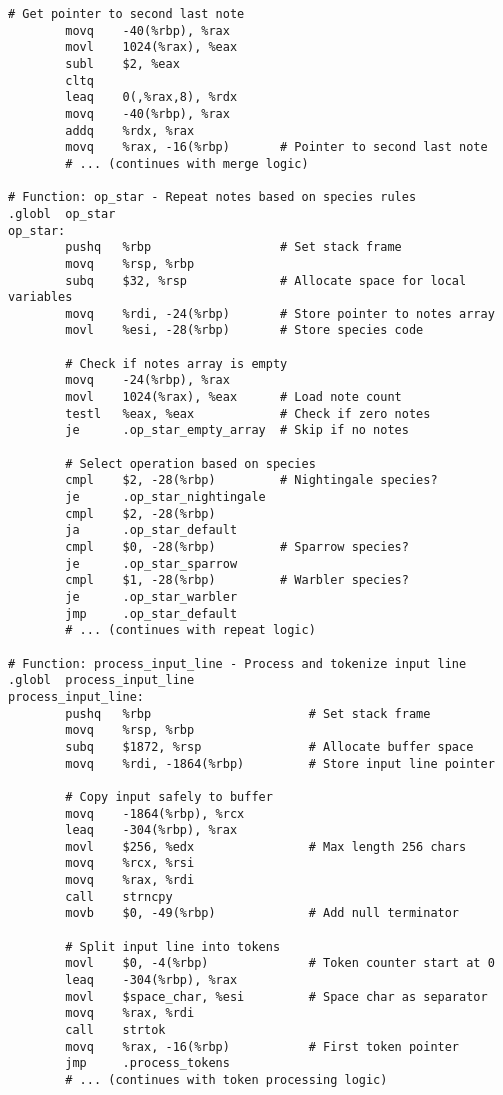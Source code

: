\documentclass[11pt]{article}
\begin{document}
\begin{lstlisting}[language={[x86masm]Assembler}, basicstyle=\ttfamily\footnotesize]
        # Get pointer to second last note
        movq    -40(%rbp), %rax
        movl    1024(%rax), %eax
        subl    $2, %eax
        cltq
        leaq    0(,%rax,8), %rdx
        movq    -40(%rbp), %rax
        addq    %rdx, %rax
        movq    %rax, -16(%rbp)       # Pointer to second last note
        # ... (continues with merge logic)

# Function: op_star - Repeat notes based on species rules
.globl  op_star
op_star:
        pushq   %rbp                  # Set stack frame
        movq    %rsp, %rbp
        subq    $32, %rsp             # Allocate space for local variables
        movq    %rdi, -24(%rbp)       # Store pointer to notes array
        movl    %esi, -28(%rbp)       # Store species code
        
        # Check if notes array is empty
        movq    -24(%rbp), %rax
        movl    1024(%rax), %eax      # Load note count
        testl   %eax, %eax            # Check if zero notes
        je      .op_star_empty_array  # Skip if no notes
        
        # Select operation based on species
        cmpl    $2, -28(%rbp)         # Nightingale species?
        je      .op_star_nightingale
        cmpl    $2, -28(%rbp)
        ja      .op_star_default
        cmpl    $0, -28(%rbp)         # Sparrow species?
        je      .op_star_sparrow
        cmpl    $1, -28(%rbp)         # Warbler species?
        je      .op_star_warbler
        jmp     .op_star_default
        # ... (continues with repeat logic)

# Function: process_input_line - Process and tokenize input line
.globl  process_input_line
process_input_line:
        pushq   %rbp                      # Set stack frame
        movq    %rsp, %rbp
        subq    $1872, %rsp               # Allocate buffer space
        movq    %rdi, -1864(%rbp)         # Store input line pointer

        # Copy input safely to buffer
        movq    -1864(%rbp), %rcx
        leaq    -304(%rbp), %rax
        movl    $256, %edx                # Max length 256 chars
        movq    %rcx, %rsi
        movq    %rax, %rdi
        call    strncpy
        movb    $0, -49(%rbp)             # Add null terminator
        
        # Split input line into tokens
        movl    $0, -4(%rbp)              # Token counter start at 0
        leaq    -304(%rbp), %rax
        movl    $space_char, %esi         # Space char as separator
        movq    %rax, %rdi
        call    strtok
        movq    %rax, -16(%rbp)           # First token pointer
        jmp     .process_tokens
        # ... (continues with token processing logic)


\end{lstlisting}
\end{document}
